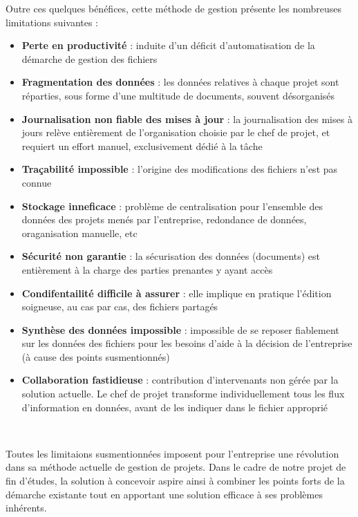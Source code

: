 \begin{spacing}{1.5}
Outre ces quelques bénéfices, cette méthode de gestion présente les nombreuses limitations suivantes :
\begin{itemize}
    \item \textbf{Perte en productivité} : induite d'un déficit d'automatisation de la démarche de gestion des fichiers
    \item \textbf{Fragmentation des données} : les données relatives à chaque projet sont réparties, sous forme d'une multitude de documents, souvent désorganisés
    \item \textbf{Journalisation non fiable des mises à jour} : la journalisation des mises à jours relève entièrement de l'organisation choisie par le chef de projet, et requiert un effort manuel, exclusivement dédié à la tâche
    \item \textbf{Traçabilité impossible} : l'origine des modifications des fichiers n'est pas connue
    \item \textbf{Stockage inneficace} : problème de centralisation pour l'ensemble des données des projets menés par l'entreprise, redondance de données, oraganisation manuelle, etc
    \item \textbf{Sécurité non garantie} : la sécurisation des données (documents) est entièrement à la charge des parties prenantes y ayant accès
    \item \textbf{Condifentailité difficile à assurer} : elle implique en pratique l'édition soigneuse, au cas par cas, des fichiers partagés
    \item \textbf{Synthèse des données impossible} : impossible de se reposer fiablement sur les données des fichiers pour les besoins d'aide à la décision de l'entreprise (à cause des points susmentionnés)
    \item \textbf{Collaboration fastidieuse} : contribution d'intervenants non gérée par la solution actuelle. Le chef de projet transforme individuellement tous les flux d'information en données, avant de les indiquer dans le fichier approprié
\end{itemize}
\

Toutes les limitaions susmentionnées imposent pour l'entreprise une révolution dans sa méthode actuelle de gestion de projets. Dans le cadre de notre projet de fin d'études, la solution à concevoir aspire ainsi à combiner les points forts de la démarche existante tout en apportant une solution efficace à ses problèmes inhérents.



\end{spacing}

